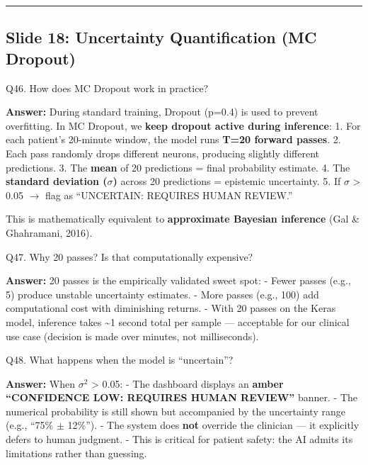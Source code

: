 \documentclass[11pt,a4paper]{article}
\begin{document}
\begin{center}\rule{0.5\linewidth}{0.5pt}\end{center}

\subsection{Slide 18: Uncertainty Quantification (MC
Dropout)}\label{slide-18-uncertainty-quantification-mc-dropout}

\begin{questionbox}
Q46. How does MC Dropout work in practice?
\end{questionbox}
\textbf{Answer:} During standard training, Dropout (p=0.4) is used to prevent
overfitting. In MC Dropout, we \textbf{keep dropout active during
inference}: 1. For each patient's 20-minute window, the model runs
\textbf{T=20 forward passes}. 2. Each pass randomly drops different
neurons, producing slightly different predictions. 3. The \textbf{mean}
of 20 predictions = final probability estimate. 4. The \textbf{standard
deviation ($\sigma$)} across 20 predictions = epistemic uncertainty. 5. If $\sigma$
\textgreater{} 0.05 $\rightarrow$ flag as ``UNCERTAIN: REQUIRES HUMAN REVIEW.''

This is mathematically equivalent to \textbf{approximate Bayesian
inference} (Gal \& Ghahramani, 2016).

\begin{questionbox}
Q47. Why 20 passes? Is that computationally expensive?
\end{questionbox}
\textbf{Answer:} 20 passes is the empirically validated sweet spot: - Fewer
passes (e.g., 5) produce unstable uncertainty estimates. - More passes
(e.g., 100) add computational cost with diminishing returns. - With 20
passes on the Keras model, inference takes \textasciitilde1 second total
per sample --- acceptable for our clinical use case (decision is made
over minutes, not milliseconds).

\begin{questionbox}
Q48. What happens when the model is ``uncertain''?
\end{questionbox}
\textbf{Answer:} When $\sigma$$^{2}$ \textgreater{} 0.05: - The dashboard displays an
\textbf{amber ``CONFIDENCE LOW: REQUIRES HUMAN REVIEW''} banner. - The
numerical probability is still shown but accompanied by the uncertainty
range (e.g., ``75\% $\pm$ 12\%''). - The system does \textbf{not} override
the clinician --- it explicitly defers to human judgment. - This is
critical for patient safety: the AI admits its limitations rather than
guessing.
\end{document}
